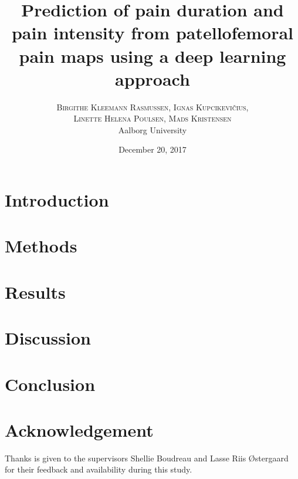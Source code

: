 \documentclass[twoside,twocolumn]{article}
\title{\huge Prediction of pain duration and pain intensity \newline from patellofemoral pain maps using a \newline deep learning approach} %
\author{%
\textsc{Birgithe Kleemann Rasmussen, Ignas Kupcikevičius,} \\
\textsc{Linette Helena Poulsen, Mads Kristensen}
 \\[1ex] %
\normalsize Aalborg University \\ %
}
\date{December 20, 2017} %
\begin{document}
\maketitle


\section{Introduction}



\section{Methods}




\section{Results}



\newpage
\section{Discussion}



\section{Conclusion}


\section{Acknowledgement}
Thanks is given to the supervisors Shellie Boudreau and Lasse Riis Østergaard for their feedback and availability during this study.  

\end{document}
